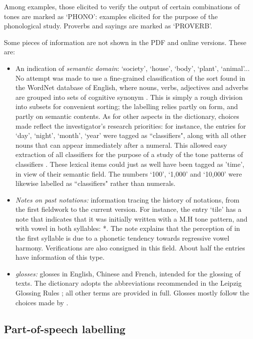 Among examples, those elicited to verify the output of certain combinations of tones are marked as ‘PHONO': examples elicited for the purpose of the phonological study. Proverbs and sayings are marked as ‘PROVERB'.

Some pieces of information are not shown in the PDF and online versions. These are:
\begin{itemize}
	\item An indication of \textit{semantic domain}: ‘society', ‘house', ‘body', ‘plant', ‘animal'... No attempt was made to use a fine-grained classification of the sort found in the WordNet database of English, where nouns, verbs, adjectives and adverbs are grouped into sets of cognitive synonym \citep{Fellbaum 2005}. This is simply a rough division into subsets for convenient sorting; the labelling relies partly on form, and partly on semantic contents. As for other aspects in the dictionary, choices made reflect the investigator's research priorities: for instance, the entries for ‘day’, ‘night’, ‘month’, ‘year’ were tagged as “classifiers", along with all other nouns that can appear immediately after a numeral. This allowed easy extraction of all classifiers for the purpose of a study of the tone patterns of classifiers \citep{Michaud2013}. These lexical items could just as well have been tagged as 'time', in view of their semantic field. The numbers ‘100’, ‘1,000’ and ‘10,000’ were likewise labelled as “classifiers" rather than numerals.
	\item \textit{Notes on past notations:} information tracing the history of notations, from the first fieldwork to the current version. For instance, the entry  ‘tile' has a note that indicates that it was initially written with a M.H tone pattern, and with vowel  in both syllables: *. The note explains that the perception of  in the first syllable is due to a phonetic tendency towards regressive vowel harmony. Verifications are also consigned in this field. About half the entries have information of this type.
	\item \textit{glosses:} glosses in English, Chinese and French, intended for the glossing of texts. The dictionary adopts the abbreviations recommended in the Leipzig Glossing Rules \citep{Comrie}; all other terms are provided in full. Glosses mostly follow the choices made by \citep{Lidz2010}.
\end{itemize}

	\subsection{Part-of-speech labelling} \label{sec:pos}
	
